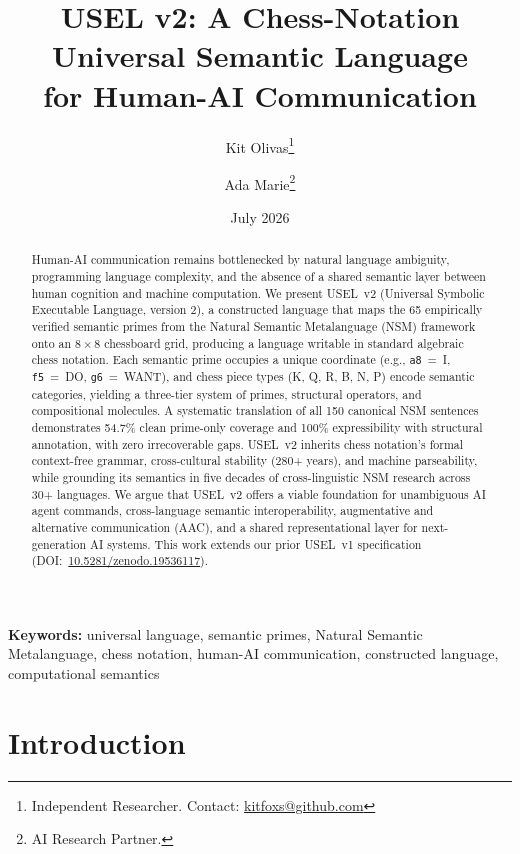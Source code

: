 \documentclass[11pt,a4paper]{article}
\title{\textbf{USEL v2: A Chess-Notation Universal Semantic Language\\for Human-AI Communication}}
\author{
    Kit Olivas\thanks{Independent Researcher. Contact: \url{kitfoxs@github.com}} \\
    \and
    Ada Marie\thanks{AI Research Partner.}
}
\date{July 2026}
\begin{document}
\maketitle

\begin{abstract}
Human-AI communication remains bottlenecked by natural language ambiguity, programming language complexity, and the absence of a shared semantic layer between human cognition and machine computation. We present USEL~v2 (Universal Symbolic Executable Language, version 2), a constructed language that maps the 65 empirically verified semantic primes from the Natural Semantic Metalanguage (NSM) framework onto an $8 \times 8$ chessboard grid, producing a language writable in standard algebraic chess notation. Each semantic prime occupies a unique coordinate (e.g., \texttt{a8}~=~I, \texttt{f5}~=~DO, \texttt{g6}~=~WANT), and chess piece types (K, Q, R, B, N, P) encode semantic categories, yielding a three-tier system of primes, structural operators, and compositional molecules. A systematic translation of all 150 canonical NSM sentences demonstrates 54.7\% clean prime-only coverage and 100\% expressibility with structural annotation, with zero irrecoverable gaps. USEL~v2 inherits chess notation's formal context-free grammar, cross-cultural stability (280+ years), and machine parseability, while grounding its semantics in five decades of cross-linguistic NSM research across 30+ languages. We argue that USEL~v2 offers a viable foundation for unambiguous AI agent commands, cross-language semantic interoperability, augmentative and alternative communication (AAC), and a shared representational layer for next-generation AI systems. This work extends our prior USEL~v1 specification (DOI:~\href{https://doi.org/10.5281/zenodo.19536117}{10.5281/zenodo.19536117}).
\end{abstract}

\noindent\textbf{Keywords:} universal language, semantic primes, Natural Semantic Metalanguage, chess notation, human-AI communication, constructed language, computational semantics

\section{Introduction}
\label{sec:introduction}
\end{document}
